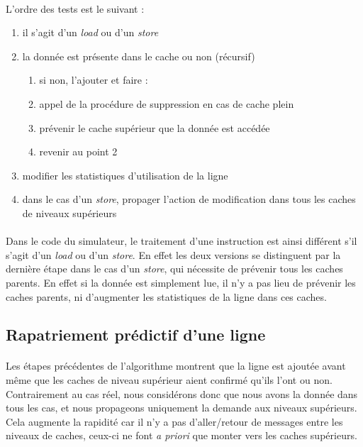 \paragraph{}
L'ordre des tests est le suivant : 
\begin{enumerate}
  \item{il s'agit d'un \emph{load} ou d'un \emph{store}}
  \item{la donnée est présente dans le cache ou non (récursif)
    \begin{enumerate}
      \item{si non, l'ajouter et faire :}
      \item{appel de la procédure de suppression en cas de cache plein}
      \item{prévenir le cache supérieur que la donnée est accédée}
      \item{revenir au point 2}
  \end{enumerate}}
  \item{modifier les statistiques d'utilisation de la ligne}
  \item{dans le cas d'un \emph{store}, propager l'action de modification dans tous les caches de niveaux supérieurs}
\end{enumerate}

\paragraph{}
Dans le code du simulateur, le traitement d'une instruction est ainsi différent s'il s'agit d'un \emph{load} ou d'un \emph{store}. En effet les deux versions se distinguent par la dernière étape dans le cas d'un \emph{store}, qui nécessite de prévenir tous les caches parents. En effet si la donnée est simplement lue, il n'y a pas lieu de prévenir les caches parents, ni d'augmenter les statistiques de la ligne dans ces caches.

\subsection{Rapatriement prédictif d'une ligne}

\paragraph{}
Les étapes précédentes de l'algorithme montrent que la ligne est ajoutée avant même que les caches de niveau supérieur aient confirmé qu'ils l'ont ou non. Contrairement au cas réel, nous considérons donc que nous avons la donnée dans tous les cas, et nous propageons uniquement la demande aux niveaux supérieurs. Cela augmente la rapidité car il n'y a pas d'aller/retour de messages entre les niveaux de caches, ceux-ci ne font \emph{a priori} que monter vers les caches supérieurs.

